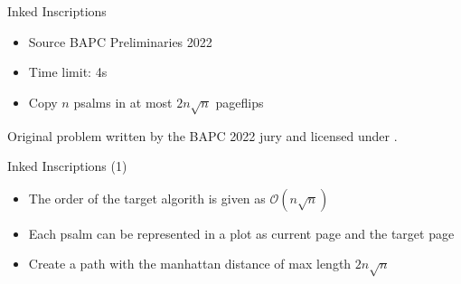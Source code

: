 \documentclass[11pt,pdf, aspectratio=169]{beamer}
\begin{document}
  \begin{frame}{Inked Inscriptions}
    \begin{itemize}
      \item Source BAPC Preliminaries 2022
      \item Time limit: 4s
      \item  Copy $n$ psalms in at most $2n\sqrt {n}$ pageflips
    \end{itemize}
    Original problem written by the BAPC 2022 jury and licensed under \doclicenseLongNameRef.

    \doclicenseImage
  \end{frame}
  \begin{frame}{Inked Inscriptions (1)}
    \begin{itemize}
      \item<+-> The order of the target algorith is given as $\mathcal{O}\left(n\sqrt {n}\right)$
      \item<+-> Each psalm can be represented in a plot as current page and the target page
      \item<+-> Create a path with the manhattan distance of max length $2n\sqrt{n}$
    \end{itemize}
    \vfill
    \centering
  \end{frame}
\end{document}
